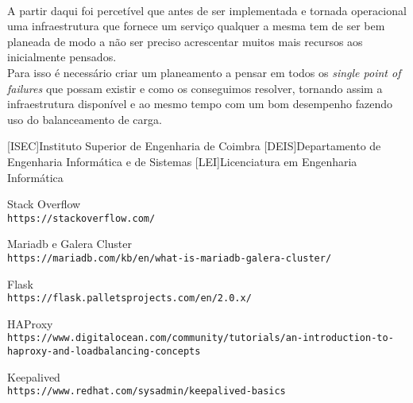 \documentclass{report}
\begin{document}
\paragraph{}
A partir daqui foi percetível que antes de ser implementada e tornada operacional uma infraestrutura que fornece um serviço qualquer a mesma tem de ser bem planeada de modo a não ser preciso acrescentar muitos mais recursos aos inicialmente pensados.\\
Para isso é necessário criar um planeamento a pensar em todos os \emph{single point of failures} que possam existir e como os conseguimos resolver, tornando assim a infraestrutura disponível e ao mesmo tempo com um bom desempenho fazendo uso do balanceamento de carga.


\begin{acronym}
[ISEC]{Instituto Superior de Engenharia de Coimbra}
[DEIS]{Departamento de Engenharia Informática e de Sistemas}
[LEI]{Licenciatura em Engenharia Informática}
\end{acronym}



\begin{thebibliography}{9}
Stack Overflow
\\\texttt{https://stackoverflow.com/}

Mariadb e Galera Cluster
\\\texttt{https://mariadb.com/kb/en/what-is-mariadb-galera-cluster/}

Flask
\\\texttt{https://flask.palletsprojects.com/en/2.0.x/}

HAProxy
\\\texttt{https://www.digitalocean.com/community/tutorials/an-introduction-to-haproxy-and-load\-balancing-concepts}

Keepalived
\\\texttt{https://www.redhat.com/sysadmin/keepalived-basics}

\end{thebibliography}
\end{document}
